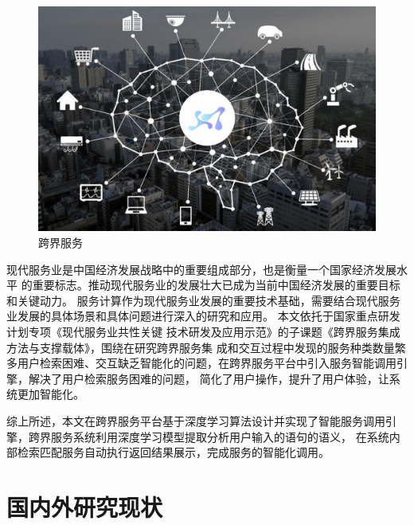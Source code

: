 \begin{figure}[htbp]
  \centering
  \includegraphics[scale=0.4]{./images/kuajiefuwu.png}
  \caption{跨界服务}
  \label{fig:kuajiefuwu}
\end{figure}


现代服务业是中国经济发展战略中的重要组成部分，也是衡量一个国家经济发展水平
的重要标志。推动现代服务业的发展壮大已成为当前中国经济发展的重要目标和关键动力。
服务计算作为现代服务业发展的重要技术基础，需要结合现代服务业发展的具体场景和具体问题进行深入的研究和应用。
本文依托于国家重点研发计划专项《现代服务业共性关键
技术研发及应用示范》的子课题《跨界服务集成方法与支撑载体》，围绕在研究跨界服务集
成和交互过程中发现的服务种类数量繁多用户检索困难、交互缺乏智能化的问题，在跨界服务平台中引入服务智能调用引擎，解决了用户检索服务困难的问题，
简化了用户操作，提升了用户体验，让系统更加智能化。

综上所述，本文在跨界服务平台基于深度学习算法设计并实现了智能服务调用引擎，跨界服务系统利用深度学习模型提取分析用户输入的语句的语义，
在系统内部检索匹配服务自动执行返回结果展示，完成服务的智能化调用。

\section{国内外研究现状}

